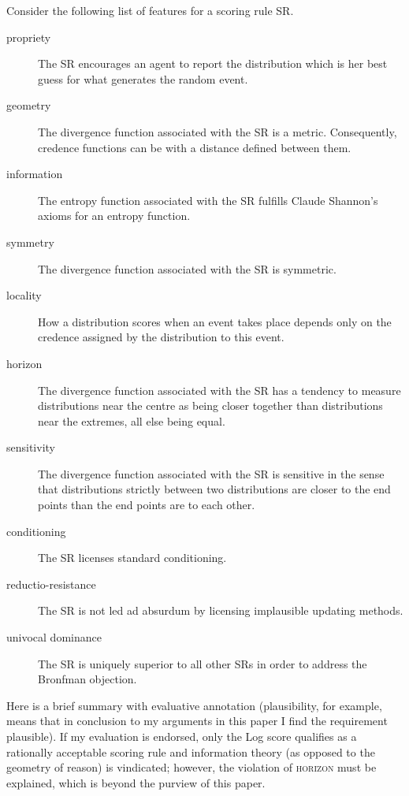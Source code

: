 \documentclass[12pt]{article}
\begin{document}
Consider the following list of features for a scoring rule SR.
\begin{description}
\item[propriety] The SR encourages an agent to report the
  distribution which is her best guess for what generates the random
  event.
\item[geometry] The divergence function associated with the SR
  is a metric. Consequently, credence functions can be
   with a distance defined between them.
\item[information] The entropy function associated with the SR
  fulfills Claude Shannon's axioms for an entropy function. 
\item[symmetry] The divergence function associated with the SR is
  symmetric. 
\item[locality] How a distribution scores when an event takes place
  depends only on the credence assigned by the distribution to this
  event.
\item[horizon] The divergence function associated with the SR has a
  tendency to measure distributions near the centre as being closer
  together than distributions near the extremes, all else being equal.
\item[sensitivity] The divergence function associated with the SR is
  sensitive in the sense that distributions strictly between two
  distributions are closer to the end points than the end points are
  to each other.
\item[conditioning] The SR licenses standard conditioning.
\item[reductio-resistance] The SR is not led ad absurdum by licensing
  implausible updating methods.
\item[univocal dominance] The SR is uniquely superior to all other SRs
  in order to address the Bronfman objection.
\end{description}

Here is a brief summary with evaluative annotation (plausibility, for
example, means that in conclusion to my arguments in this paper I find
the requirement plausible). If my evaluation is endorsed, only the Log
score qualifies as a rationally acceptable scoring rule and
information theory (as opposed to the geometry of reason) is
vindicated; however, the violation of \textsc{horizon} must be
explained, which is beyond the purview of this paper.
\end{document}
